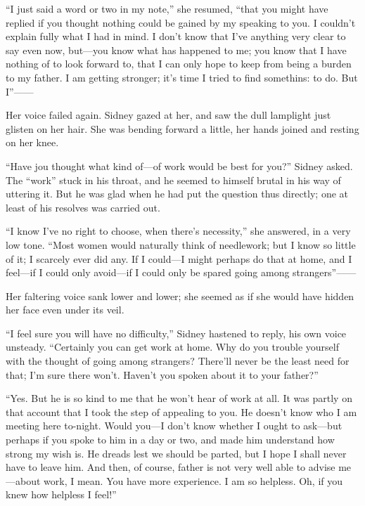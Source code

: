 ``I just said a word or two in my note,'' she resumed, ``that you might
have replied if you thought nothing could be gained by my speaking to
you. I couldn't explain fully what I had in mind. I don't know that I've
anything very clear to say even now, but---you know what has happened to
me; you know that I have nothing of to look forward to, that I can only
hope to keep from being a burden to my father. I am getting stronger;
it's time I tried to find somethins: to do. But I''{{------}}

Her voice failed again. Sidney gazed at her, and saw the dull lamplight
just glisten on her hair. She was bending forward a little, her hands
joined and resting on her knee.

{\protect\hypertarget{81}{}{}}``Have jou thought what kind of---of work
would be best for you?'' Sidney asked. The ``work'' stuck in his throat,
and he seemed to himself brutal in his way of uttering it. But he was
glad when he had put the question thus directly; one at least of his
resolves was carried out.

``I know I've no right to choose, when there's necessity,'' she
answered, in a very low tone. ``Most women would naturally think of
needlework; but I know so little of it; I scarcely ever did any. If I
could---I might perhaps do that at home, and I feel---if I could only
avoid---if I could only be spared going among strangers''{{------}}

Her faltering voice sank lower and lower; she seemed as if she would
have hidden her face even under its veil.

``I feel sure you will have no difficulty,'' Sidney hastened to reply,
his own voice unsteady. ``Certainly you can get work at home. Why do you
trouble yourself with the thought of going among strangers? There'll
never be the least need for that; I'm sure there won't. Haven't you
spoken about it to your father?''

{\protect\hypertarget{82}{}{}}``Yes. But he is so kind to me that he
won't hear of work at all. It was partly on that account that I took the
step of appealing to you. He doesn't know who I am meeting here
to-night. Would you---I don't know whether I ought to ask---but perhaps
if you spoke to him in a day or two, and made him understand how strong
my wish is. He dreads lest we should be parted, but I hope I shall never
have to leave him. And then, of course, father is not very well able to
advise me---about work, I mean. You have more experience. I am so
helpless. Oh, if you knew how helpless I feel!''


